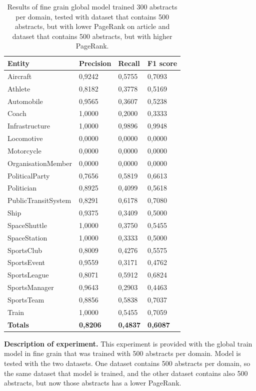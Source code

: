 \documentclass[thesis=M,english]{FITthesis}[2018/05/30]
\begin{document}
\begin{table}[H]\centering
		\begin{tabular}{|l|l|l|l|}
			\hline {\textbf{Entity}} & {\textbf{Precision}} & {\textbf{Recall}} & {\textbf{F1 score}}\\\hline
				Aircraft & 0,9242 & 0,5755 & 0,7093\\
				Athlete & 0,8182 & 0,3778 & 0,5169\\
				Automobile & 0,9565 & 0,3607 & 0,5238\\ 
				Coach & 1,0000 & 0,2000 & 0,3333\\
				Infrastructure & 1,0000 & 0,9896 & 0,9948\\
				Locomotive & 0,0000 & 0,0000 & 0,0000\\
				Motorcycle & 0,0000 & 0,0000 & 0,0000\\
				OrganisationMember & 0,0000 & 0,0000 & 0,0000\\				
				PoliticalParty & 0,7656 & 0,5819 & 0,6613\\
				Politician & 0,8925 & 0,4099 & 0,5618\\
				PublicTransitSystem & 0,8291 & 0,6178 & 0,7080\\
				Ship & 0,9375 & 0,3409 & 0,5000\\
				SpaceShuttle & 1,0000 & 0,3750 & 0,5455\\
				SpaceStation & 1,0000 & 0,3333 & 0,5000\\ 
				SportsClub & 0,8009 & 0,4276 & 0,5575\\
				SportsEvent & 0,9559 & 0,3171 & 0,4762\\
				SportsLeague & 0,8071 & 0,5912 & 0,6824\\
				SportsManager & 0,9643 & 0,2903 & 0,4463\\
				SportsTeam & 0,8856 & 0,5838 & 0,7037\\
				Train & 1,0000 & 0,5455 & 0,7059\\\hline
				\textbf{Totals} & \textbf{0,8206} & \textbf{0,4837} & \textbf{0,6087}\\\hline
		\end{tabular}
		\caption{Results of fine grain global model trained 300 abstracts per domain, tested with dataset that contains 500 abstracts, but with lower PageRank on article and dataset that contains 500 abstracts, but with higher PageRank. \label{table:Global300FineDomainTestedWithTwo500Datasets}}
	\end{table}

\textbf{Description of experiment.} This experiment is provided with the global train model in fine grain that was trained with 500 abstracts per domain. Model is tested with the two datasets. One dataset contains 500 abstracts per domain, so the same dataset that model is trained, and the other dataset contains also 500 abstracts, but now those abstracts has a lower PageRank. 
\end{document}
